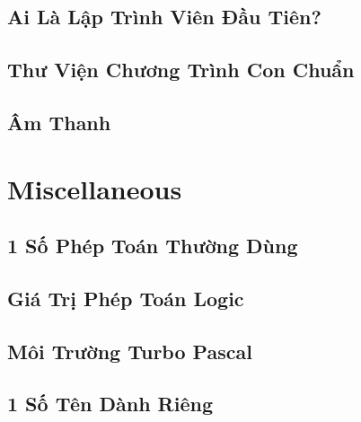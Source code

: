 \documentclass[oneside]{book}
\numberwithin{equation}{section}
\begin{document}

\section{Ai Là Lập Trình Viên Đầu Tiên?}


\section{Thư Viện Chương Trình Con Chuẩn}


\section{Âm Thanh}


\appendix

\chapter{Miscellaneous}

\section{1 Số Phép Toán Thường Dùng}


\section{Giá Trị Phép Toán Logic}


\section{Môi Trường Turbo Pascal}


\section{1 Số Tên Dành Riêng}
\end{document}
